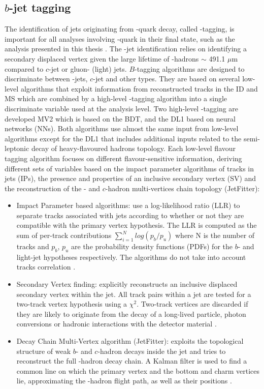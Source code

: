 \subsection{$b$-jet tagging}
\label{Jet:Tag:Dlr}
The identification of jets originating from \bq-quark decay, called \bq-tagging, is important for all analyses involving \bq-quark in their final state, such as the analysis presented in this thesis \HHyybb. The \bq-jet identification relies on identifying a secondary displaced vertex given the large lifetime of \bq-hadrons $\sim$ 491.1 $\mu$m compared to $c$-jet or gluon- (light) jets. $B$-tagging algorithms are designed to discriminate between \bq-jets, $c$-jet and other types. They are based on several low-level algorithms that exploit information from reconstructed tracks in the ID and MS which are combined by a high-level \bq-tagging algorithm into a single discriminate variable used at the analysis level. Two high-level \bq-tagging are developed MV2 which is based on the BDT, and the DL1 based on neural networks (NNs). Both algorithms use almost the same input from low-level algorithms except for the DL1 that includes additional inputs related to the semi-leptonic decay of heavy-flavoured hadrons topology. Each low-level flavour tagging algorithm focuses on different flavour-sensitive information, deriving different sets of variables based on the impact parameter algorithms of tracks in jets (IPs), the presence and properties of an inclusive secondary vertex (SV) and the reconstruction of the \bq- and $c$-hadron multi-vertices chain topology (JetFitter):
\begin{itemize}
    \item Impact Parameter based algorithms: use a log-likelihood ratio (LLR) to separate tracks associated with jets according to whether or not they are compatible with the primary vertex hypothesis. The LLR is computed as the sum of per-track contributions $\sum_{i=1}^{N}log(p_b/p_u)$ where N is the number of tracks and $p_b$, $p_u$ are the probability density functions (PDFs) for the $b$- and light-jet hypotheses respectively. The algorithms do not take into account tracks correlation \cite{IP,IP2}. 
    \item Secondary Vertex finding: explicitly reconstructs an inclusive displaced secondary vertex within the jet. All track pairs within a jet are tested for a two-track vertex hypothesis using a $\chi^2$. Two-track vertices are discarded if they are likely to originate from the decay of a long-lived particle, photon conversions or hadronic interactions with the detector material \cite{SV}.
    \item Decay Chain Multi-Vertex algorithm (JetFitter): exploits the topological structure of weak $b$- and $c$-hadron decays inside the jet and tries to reconstruct the full \bq-hadron decay chain. A Kalman filter is used to find a common line on which the primary vertex and the bottom and charm vertices lie, approximating the \bq-hadron flight path, as well as their positions \cite{JetFitter}.
\end{itemize}
